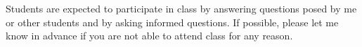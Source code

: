 Students are expected to participate in class by answering questions posed by me or other students and by asking informed questions. If possible, please let me know in advance if you are not able to attend class for any reason. 